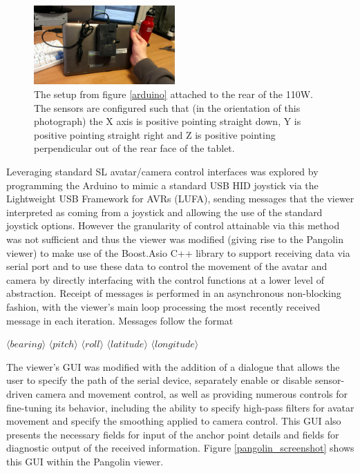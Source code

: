 \begin{figure}[h]
\centering
\includegraphics[width=0.48\textwidth]{images/tablet_back}
\caption{The setup from figure \ref{arduino} attached to the rear of the 110W. The sensors are configured such that (in the orientation of this photograph) the X axis is positive pointing straight down, Y is positive pointing straight right and Z is positive pointing perpendicular out of the rear face of the tablet.}
\label{tablet_back}
\end{figure}

Leveraging standard SL avatar/camera control interfaces was explored by programming the Arduino to mimic a standard USB HID joystick via the Lightweight USB Framework for AVRs (LUFA), sending messages that the viewer interpreted as coming from a joystick and allowing the use of the standard joystick options. However the granularity of control attainable via this method was not sufficient and thus the viewer was modified (giving rise to the Pangolin viewer) to make use of the Boost.Asio C++ library to support receiving data via serial port and to use these data to control the movement of the avatar and camera by directly interfacing with the control functions at a lower level of abstraction. Receipt of messages is performed in an asynchronous non-blocking fashion, with the viewer's main loop processing the most recently received message in each iteration. Messages follow the format

$\langle bearing \rangle$ $\langle pitch \rangle$ $\langle roll \rangle$ $\langle latitude \rangle$ $\langle longitude \rangle$

The viewer's GUI was modified with the addition of a dialogue that allows the user to specify the path of the serial device, separately enable or disable sensor-driven camera and movement control, as well as providing numerous controls for fine-tuning its behavior, including the ability to specify high-pass filters for avatar movement and specify the smoothing applied to camera control. This GUI also presents the necessary fields for input of the anchor point details and fields for diagnostic output of the received information. Figure \ref{pangolin_screenshot} shows this GUI within the Pangolin viewer.

